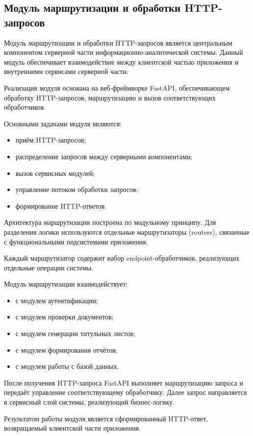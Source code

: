 \subsection{Модуль маршрутизации и обработки HTTP-запросов}

Модуль маршрутизации и обработки HTTP-запросов является центральным компонентом серверной части информационно-аналитической системы. Данный модуль обеспечивает взаимодействие между клиентской частью приложения и внутренними сервисами серверной части.

Реализация модуля основана на веб-фреймворке FastAPI, обеспечивающем обработку HTTP-запросов, маршрутизацию и вызов соответствующих обработчиков.

Основными задачами модуля являются:
\begin{itemize}
	\item приём HTTP-запросов;
	\item распределение запросов между серверными компонентами;
	\item вызов сервисных модулей;
	\item управление потоком обработки запросов;
	\item формирование HTTP-ответов.
\end{itemize}

Архитектура маршрутизации построена по модульному принципу. Для разделения логики используются отдельные маршрутизаторы (routers), связанные с функциональными подсистемами приложения.

Каждый маршрутизатор содержит набор endpoint-обработчиков, реализующих отдельные операции системы.

Модуль маршрутизации взаимодействует:
\begin{itemize}
	\item с модулем аутентификации;
	\item с модулем проверки документов;
	\item с модулем генерации титульных листов;
	\item с модулем формирования отчётов;
	\item с модулем работы с базой данных.
\end{itemize}

После получения HTTP-запроса FastAPI выполняет маршрутизацию запроса и передаёт управление соответствующему обработчику. Далее запрос направляется в сервисный слой системы, реализующий бизнес-логику.

Результатом работы модуля является сформированный HTTP-ответ, возвращаемый клиентской части приложения.

